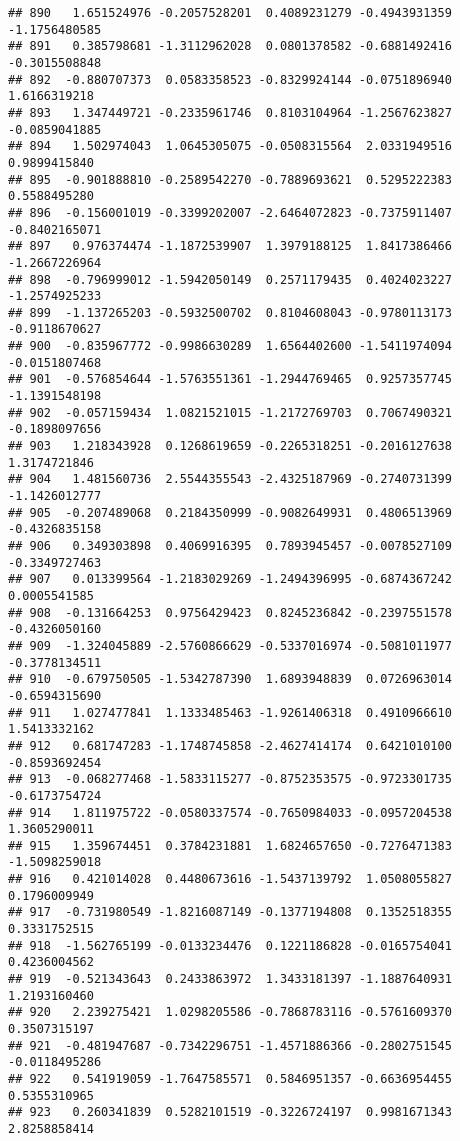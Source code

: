 \documentclass[
]{article}
\begin{document}
\begin{verbatim}
## 890   1.651524976 -0.2057528201  0.4089231279 -0.4943931359 -1.1756480585
## 891   0.385798681 -1.3112962028  0.0801378582 -0.6881492416 -0.3015508848
## 892  -0.880707373  0.0583358523 -0.8329924144 -0.0751896940  1.6166319218
## 893   1.347449721 -0.2335961746  0.8103104964 -1.2567623827 -0.0859041885
## 894   1.502974043  1.0645305075 -0.0508315564  2.0331949516  0.9899415840
## 895  -0.901888810 -0.2589542270 -0.7889693621  0.5295222383  0.5588495280
## 896  -0.156001019 -0.3399202007 -2.6464072823 -0.7375911407 -0.8402165071
## 897   0.976374474 -1.1872539907  1.3979188125  1.8417386466 -1.2667226964
## 898  -0.796999012 -1.5942050149  0.2571179435  0.4024023227 -1.2574925233
## 899  -1.137265203 -0.5932500702  0.8104608043 -0.9780113173 -0.9118670627
## 900  -0.835967772 -0.9986630289  1.6564402600 -1.5411974094 -0.0151807468
## 901  -0.576854644 -1.5763551361 -1.2944769465  0.9257357745 -1.1391548198
## 902  -0.057159434  1.0821521015 -1.2172769703  0.7067490321 -0.1898097656
## 903   1.218343928  0.1268619659 -0.2265318251 -0.2016127638  1.3174721846
## 904   1.481560736  2.5544355543 -2.4325187969 -0.2740731399 -1.1426012777
## 905  -0.207489068  0.2184350999 -0.9082649931  0.4806513969 -0.4326835158
## 906   0.349303898  0.4069916395  0.7893945457 -0.0078527109 -0.3349727463
## 907   0.013399564 -1.2183029269 -1.2494396995 -0.6874367242  0.0005541585
## 908  -0.131664253  0.9756429423  0.8245236842 -0.2397551578 -0.4326050160
## 909  -1.324045889 -2.5760866629 -0.5337016974 -0.5081011977 -0.3778134511
## 910  -0.679750505 -1.5342787390  1.6893948839  0.0726963014 -0.6594315690
## 911   1.027477841  1.1333485463 -1.9261406318  0.4910966610  1.5413332162
## 912   0.681747283 -1.1748745858 -2.4627414174  0.6421010100 -0.8593692454
## 913  -0.068277468 -1.5833115277 -0.8752353575 -0.9723301735 -0.6173754724
## 914   1.811975722 -0.0580337574 -0.7650984033 -0.0957204538  1.3605290011
## 915   1.359674451  0.3784231881  1.6824657650 -0.7276471383 -1.5098259018
## 916   0.421014028  0.4480673616 -1.5437139792  1.0508055827  0.1796009949
## 917  -0.731980549 -1.8216087149 -0.1377194808  0.1352518355  0.3331752515
## 918  -1.562765199 -0.0133234476  0.1221186828 -0.0165754041  0.4236004562
## 919  -0.521343643  0.2433863972  1.3433181397 -1.1887640931  1.2193160460
## 920   2.239275421  1.0298205586 -0.7868783116 -0.5761609370  0.3507315197
## 921  -0.481947687 -0.7342296751 -1.4571886366 -0.2802751545 -0.0118495286
## 922   0.541919059 -1.7647585571  0.5846951357 -0.6636954455  0.5355310965
## 923   0.260341839  0.5282101519 -0.3226724197  0.9981671343  2.8258858414

\end{verbatim}
\end{document}
